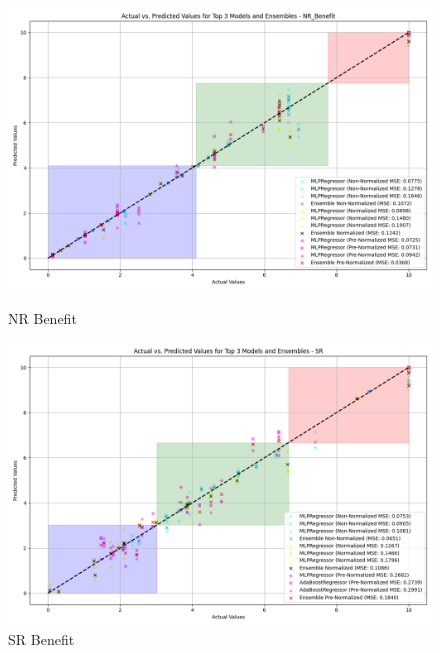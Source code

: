 \begin{figure}[H]
    \centering
    \begin{minipage}{0.45\textwidth}
        \centering
        \includegraphics[width=\linewidth]{reg_section_specific/ensemble_learning/actual_vs_predicted_top_3_models_and_ensembles_NR_Benefit.png}
        \caption{NR Benefit}
        \label{reg_spec_fig:nr_ben_ensemble}
    \end{minipage}\hfill
    \begin{minipage}{0.45\textwidth}
        \centering
        \includegraphics[width=\linewidth]{reg_section_specific/ensemble_learning/actual_vs_predicted_top_3_models_and_ensembles_SR.png}
        \caption{SR Benefit}
        \label{reg_spec_fig:sr_ben_ensemble}
    \end{minipage}
\end{figure}

